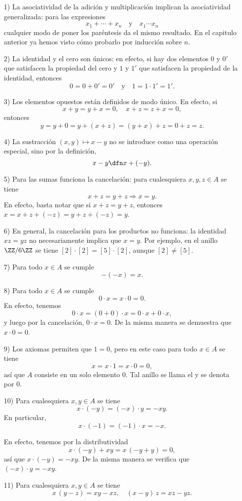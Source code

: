 \begin{enumerate}
\item[1)] La asociatividad de la adición y multiplicación implican
  la asociatividad generalizada: para las expresiones
  $$x_1 + \cdots + x_n \quad\text{y}\quad x_1\cdots x_n$$
  cualquier modo de poner los paréntesis da el mismo resultado. En el capitulo
  anterior ya hemos visto cómo probarlo por inducción sobre $n$.

\item[2)] La identidad y el cero son únicos: en efecto, si hay dos elementos $0$
  y $0'$ que satisfacen la propiedad del cero y $1$ y $1'$ que satisfacen
  la propiedad de la identidad, entonces
  $$0 = 0 + 0' = 0' \quad\text{y}\quad 1 = 1\cdot 1' = 1'.$$

\item[3)] Los elementos opuestos están definidos de modo único. En efecto, si
  $$x + y = y + x = 0, \quad x + z = z + x = 0,$$
  entonces
  $$y = y+0 = y+(x+z) = (y+x)+z = 0+z = z.$$

\item[4)] La sustracción $(x,y) \mapsto x-y$ no se introduce como una operación
  especial, sino por la definición,
$$x-y \dfn x + (-y).$$

\item[5)] Para las sumas funciona la cancelación: para cualesquiera $x,y,z\in A$
  se tiene
  $$x+z = y+z \Longrightarrow x=y.$$
  En efecto, basta notar que si $x+z = y+z$, entonces
  $x = x+z+(-z) = y+z+(-z) = y$.

\item[6)] En general, la cancelación para los productos no funciona:
  la identidad $xz = yz$ no necesariamente implica que $x = y$. Por ejemplo,
  en el anillo $\ZZ/6\ZZ$ se tiene $[2]\cdot [2] = [5]\cdot [2]$, aunque
  $[2] \ne [5]$.

\item[7)] Para todo $x\in A$ se cumple
  $$-(-x) = x.$$

\item[8)] Para todo $x\in A$ se cumple
  $$0\cdot x = x\cdot 0 = 0.$$
  En efecto, tenemos
  $$0\cdot x = (0+0)\cdot x = 0\cdot x + 0\cdot x,$$
  y luego por la cancelación, $0\cdot x = 0$. De la misma manera se demuestra
  que $x\cdot 0 = 0$.

\item[9)] Los axiomas permiten que $1 = 0$, pero en este caso para todo $x\in A$
  se tiene
  $$x = x\cdot 1 = x\cdot 0 = 0,$$
  así que $A$ consiste en un solo elemento $0$. Tal anillo se llama el
   y se denota por $0$.

\item[10)] Para cualesquiera $x,y\in A$ se tiene
  $$x\cdot (-y) = (-x)\cdot y = -xy.$$
  En particular,
  $$x\cdot (-1) = (-1)\cdot x = -x.$$

  En efecto, tenemos por la distributividad
  $$x\cdot (-y) + xy = x\,(-y+y) = 0,$$
  así que $x\cdot (-y) = -xy$. De la misma manera se verifica que
  $(-x)\cdot y = -xy$.

\item[11)] Para cualesquiera $x,y\in A$ se tiene
  $$x\,(y-z) = xy - xz, \quad (x-y)\,z = xz - yz.$$
\end{enumerate}

